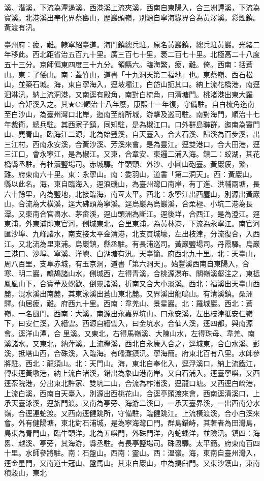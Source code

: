 \begin{pinyinscope}
溪、潛溪，下流為潭遏溪。西港溪上流夾溪，西南自東陽入，合三洲譚溪，下流為寶溪。北港溪出奉化界蔡嶴山，歷巖頭嶺，別源自寧海緣界合為黃澤溪。彩煙鎮。黃渡有汛。

臺州府：疲，難。隸寧紹臺道。海門鎮總兵駐。原名黃巖鎮，總兵駐黃巖。光緒二年移此。西北距省治五百九十里。廣三百七十里，袤二百七十里。北極高二十八度五十三分。京師偏東四度三十九分。領縣六。臨海繁，疲，難。倚。西南：括蒼山。東：了倭山。南：蓋竹山，道書「十九洞天第二福地」也。東蔡嶺、西石松山，並築石城。海，東自寧海入，逕坡壩江，白岱山扼其口。納上流花橋港，南逕泗淋汛，納上流洞港，又南逕有殿角，南對白梳角，曰清塘門。桃渚港出東大羅山，合矩溪入之。其★C9順治十八年廢，康熙十一年復，守備駐。自白梳角迤南至白沙山，為臺州灣口北岸，迤南至前所城，游擊及巡司駐。南對海門，順治十七年裁衛，總兵駐。其西家子鎮，同知駐，是為椒江口。口外群島聯群，迤南為竇門山、麂青山。臨海江二源，北為始豐溪，自天臺入，合大石溪、歸溪為百步溪，出三江村，西南永安溪，合黃沙溪、芳溪來會，是為靈江。逕雙港口，合大田港，逕三江口，會永寧江，是為椒江。又東，合章安、東邏二浦入海。鎮二：蛟湖，其花橋縣丞駐。有杜瀆鹽場司。赤城驛。牛頭頸、外沙、小圓山砲臺。黃巖疲，繁，難。府東南六十里。東：永寧山。南：委羽山，道書「第二洞天」。西：黃巖山，縣以此名。海，東自臨海入，逕浪磯山，為臺州灣口南岸，有丁進、洪輔兩塘，長六十餘里，內為鹽地，北接臨海，南亙太平。西北：永寧江出西塵山，別源出黃巖山，合流為大橫溪，逕大砩頭為寧溪。逕烏巖為烏巖溪，合柔極、小坑二港為長潭。又東南合官嶴水、茅畬溪，逕山頭洲為斷江。逕後垟，合西江，是為澄江。逕東浦，外東浦即東官河，側城東北，合里東浦，為黃林港，下流為永寧江。南官河匯沙埠、九峰諸水，南支接太平金清港，北支貫城壕，左出枝津，分流復合，入西江。又北流為里東浦。烏巖鎮，縣丞駐。有長浦巡司。黃巖鹽場司。丹霞驛。烏巖三港口、沙埠、寧溪、洋嶼、白湖塘有汛。天臺簡。府西北九十里。北：天臺山，周八百里，支阜赤城，有玉京洞，道書「第六洞天」。始豐溪西南自東陽入，合寒、明二巖，鷓鴣諸山水，側城西，左得青溪，合桃源瀑布、關嶺溪壑注之，東抵鳳凰山下，合寶華及螺歡、倒靈諸溪，折南又合大小淡溪。西北：福溪出天臺山西麓，混水溪出南麓，其東泳溪出蒼山東北麓。又界溪出龍鳴山。有清溪鎮。桑洲驛。仙居疲，難。府西九十里。西南：韋羌山、景星巖。北：羅城巖。西北：蒼嶺，一名風門。西南：大溪，南源出永嘉界坑山，曰永安溪，左出枝津抵安仁嶺下，曰安仁溪，入縉雲。西源自縉雲入，曰金坑水，合仙人溪，逕四都，與南源會。逕洋山潭，合里溪。又東北，右得馬嶺溪、大陳山水，左得珠母、韋羌、南溪諸水。又東北，納萍溪。上流櫸溪，西北自永康入合之，逕城東，合白水溪、彭溪，抵塔山西，合硃溪，入臨海。有皤灘鎮汛。寧海簡。府東北百有八里。水師參將駐。西北：龍須山。北：天門山。海，東北自奉化入，逕浮溪口，納上流鐵江，轉東逕黃墩港，納上流白渚溪，錯出為象山港南岸。又自石浦入，逕臺寧嶼，又西逕茶院港，分出東北許家、雙坑二山，合流為柞浦溪，逕龍口塘。又西逕白嶠港，上流白溪，西南自天臺入，別源出西桃花山，合逕亭頭渡來會，西南逕清溪口，上承天臺泳溪，逕旂門渡。又南為亭旁、海游二溪口，一承天臺界溪，一出西南分水嶺，合逕連蛇渡。又西南逕健跳所，守備駐，臨健跳江。上流橫渡溪，合小白溪來會。外有健陽塘，東北對石浦城，是為寧海灣口門。群島錯峙，其著者為田灣島，島東為青門山，臨牛頭洋，北為五嶼門，外硃門洋，內蛇蟠洋，並險汛。鎮四：海嶴、越溪、亭旁，其海游，縣丞駐。有長亭鹽場司。硃嶴驛。太平簡。府東南百四十里。水師參將駐。南：石盤山。西南：靈山。西：溫嶺。海，東南自臺州灣入，逕金星門，又南道士冠山、盤馬山。其東白巖山，中為搗臼門。又東沙鑊山，東南積穀山，東北
\end{pinyinscope}
